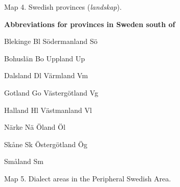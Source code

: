 \begin{figure}[h]

\begin{minipage}{5.99722in}

\label{bkm:Ref264031279}Map 4. Swedish provinces (\textit{landskap}).


\end{minipage}

\end{figure}

\begin{figure}[h]

\begin{minipage}{5.875in}

\textbf{Abbreviations for provinces in Sweden south of}

Blekinge  Bl  Södermanland  Sö

Bohuslän  Bo  Uppland  Up

Dalsland  Dl  Värmland  Vm

Gotland  Go  Västergötland  Vg

Halland  Hl  Västmanland  Vl

Närke  Nä  Öland  Öl

Skåne  Sk  Östergötland  Ög

Småland  Sm    

\end{minipage}

\end{figure}

\begin{figure}[h]

\begin{minipage}{6.65486in}

\label{bkm:Ref216765041}Map 5. Dialect areas in the Peripheral Swedish Area.


\end{minipage}

\end{figure}

\section{ }

